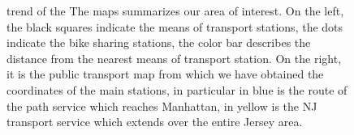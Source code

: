\begin{figure}[h!]
	\centering
	\quad
	\quad
	\caption[]{trend of the The maps summarizes our area of interest. On the left, the black squares indicate the means of transport stations, the dots indicate the bike sharing stations, the color bar describes the distance from the nearest means of transport station. On the right, it is the public transport map from which we have obtained the coordinates of the main stations, in particular in blue is the route of the path service which reaches Manhattan, in yellow is the NJ transport service which extends over the entire Jersey area.}
\end{figure} 

